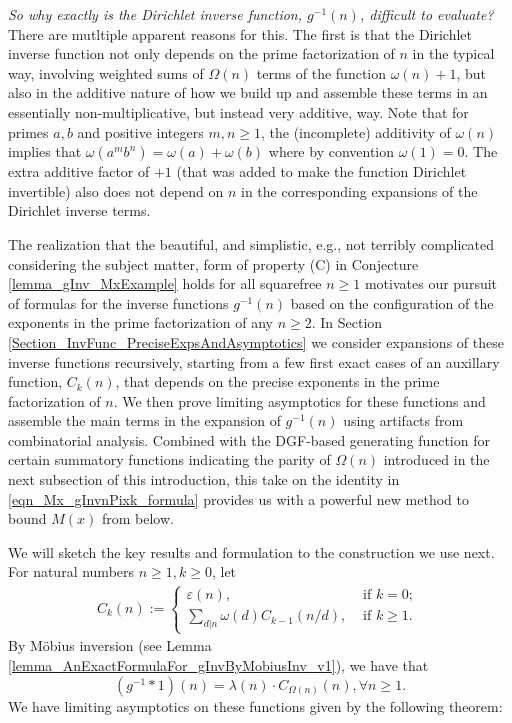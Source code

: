 \documentclass[11pt,reqno,a4letter]{article}
\numberwithin{figure}{section}
\numberwithin{table}{section}
\theoremstyle{plain}
\numberwithin{theorem}{section}
\theoremstyle{definition}
\begin{document}
\textit{So why exactly is the Dirichlet inverse function, $g^{-1}(n)$, difficult to evaluate? } 
There are mutltiple apparent reasons for this. The first is that the Dirichlet inverse function not only 
depends on the prime factorization of $n$ in the typical way, involving weighted sums of $\Omega(n)$ terms of the 
function $\omega(n) + 1$, but also in the additive nature of how we build up and assemble these terms in an essentially 
non-multiplicative, but instead very additive, way.  
Note that for primes $a,b$ and positive integers $m,n \geq 1$, the 
(incomplete) additivity of $\omega(n)$ implies that $\omega(a^m b^n) = \omega(a) + \omega(b)$ where by convention 
$\omega(1) = 0$. The extra additive factor of $+1$ (that was added to make the function Dirichlet invertible) 
also does not depend on $n$ in the corresponding expansions of the Dirichlet inverse terms. 

The realization that the beautiful, and simplistic, e.g., not terribly complicated considering the 
subject matter, form of property (C) 
in Conjecture \ref{lemma_gInv_MxExample} holds for all squarefree $n \geq 1$ 
motivates our pursuit of formulas for the inverse functions $g^{-1}(n)$ based on the configuration of the 
exponents in the prime factorization of any $n \geq 2$. 
In Section \ref{Section_InvFunc_PreciseExpsAndAsymptotics} we consider expansions of these inverse functions 
recursively, starting from a few first exact cases of an auxillary function, $C_k(n)$, 
that depends on the precise exponents in the prime factorization of $n$. 
We then prove limiting asymptotics for these functions and assemble the main terms in the expansion of 
$g^{-1}(n)$ using artifacts from combinatorial analysis. 
Combined with the DGF-based generating function for certain summatory functions indicating the parity of 
$\Omega(n)$ introduced in the next subsection of this introduction, 
this take on the identity in \eqref{eqn_Mx_gInvnPixk_formula} provides us with a powerful new method to 
bound $M(x)$ from below. 

We will sketch the key results and formulation to the construction we use next. 
For natural numbers $n \geq 1, k \geq 0$, let 
\begin{align*} 
C_k(n) := \begin{cases} 
     \varepsilon(n), & \text{ if $k = 0$; } \\ 
     \sum\limits_{d|n} \omega(d) C_{k-1}(n/d), & \text{ if $k \geq 1$. } 
     \end{cases} 
\end{align*} 
By M\"obius inversion (see Lemma \ref{lemma_AnExactFormulaFor_gInvByMobiusInv_v1}), 
we have that 
\[
(g^{-1} \ast 1)(n) = \lambda(n) \cdot C_{\Omega(n)}(n), \forall n \geq 1. 
\]
We have limiting asymptotics on these functions given by the following theorem: 
\end{document}
